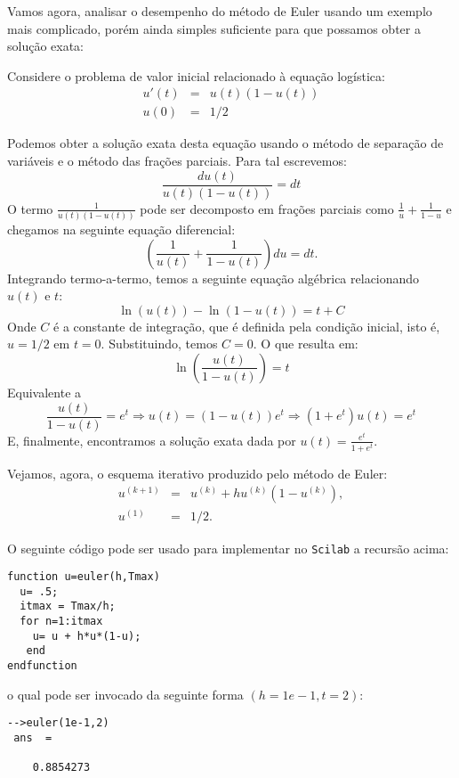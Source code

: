 Vamos agora, analisar o desempenho do método de Euler usando um exemplo mais complicado, porém ainda simples suficiente para que possamos obter a solução exata:
\begin{ex}\label{ex_euler_1}
Considere o problema de valor inicial relacionado à equação logística:
\begin{eqnarray*}
u'(t)&=&u(t)(1-u(t))\\
u(0)&=&1/2
\end{eqnarray*}
\end{ex}
Podemos obter a solução exata desta equação usando o método de separação de variáveis e o método das frações parciais. Para tal escrevemos:
\begin{equation*}
\frac{du(t)}{u(t)(1-u(t))}=dt
\end{equation*}
O termo $\frac{1}{u(t)(1-u(t))}$ pode ser decomposto em frações parciais como $\frac{1}{u}+\frac{1}{1-u}$ e chegamos na seguinte equação diferencial:
\begin{equation*}
\left(\frac{1}{u(t)}+\frac{1}{1-u(t)}\right)du=dt.
\end{equation*}
Integrando termo-a-termo, temos a seguinte equação algébrica relacionando $u(t)$ e $t$:
\begin{equation*}
\ln(u(t))-\ln\left(1-u(t)\right)=t+C
\end{equation*}
Onde $C$ é a constante de integração, que é definida pela condição inicial, isto é, $u=1/2$ em $t=0$. Substituindo, temos $C=0$. O que resulta em:
\begin{equation*}
\ln\left(\frac{u(t)}{1-u(t)}\right)=t
\end{equation*}
Equivalente a
\begin{equation*}
\frac{u(t)}{1-u(t)}=e^{t} \Longrightarrow u(t)=(1-u(t))e^{t} \Longrightarrow (1+e^t)u(t)=e^{t}
\end{equation*}
E, finalmente, encontramos a solução exata dada por $u(t)=\frac{e^t}{1+e^{t}}$.

Vejamos, agora, o esquema iterativo produzido pelo método de Euler:
\begin{eqnarray*}
u^{(k+1)}&=& u^{(k)}+h u^{(k)}(1-u^{(k)}), \\
u^{(1)}&=& 1/2.
\end{eqnarray*}


\ifisscilab
O seguinte código pode ser usado para implementar no \verb+Scilab+ a recursão acima:
\begin{verbatim}
function u=euler(h,Tmax)
  u= .5;
  itmax = Tmax/h;
  for n=1:itmax
    u= u + h*u*(1-u);
   end
endfunction
\end{verbatim}
o qual pode ser invocado da seguinte forma $\left(h=1e-1, t=2\right)$:
\begin{verbatim}
-->euler(1e-1,2)
 ans  =
 
    0.8854273  
\end{verbatim}


